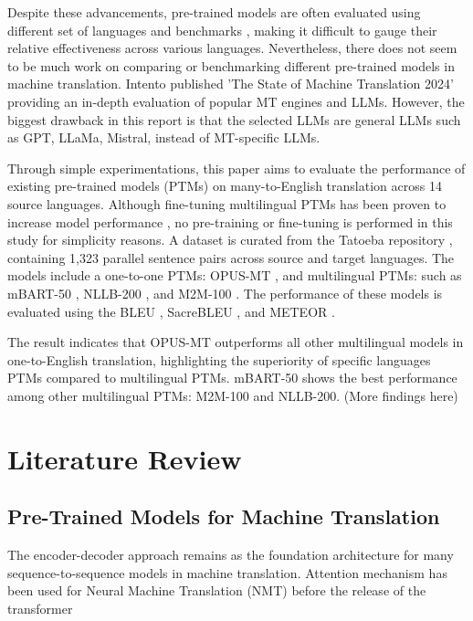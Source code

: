 \documentclass[a4paper]{article}
\begin{document}
Despite these advancements, pre-trained models are often evaluated using different set of languages and benchmarks \cite{liu-2020-mbart,nllb200-2020,fan-2020-m2m100,wei-2023-polylm}, making it difficult to gauge their relative effectiveness across various languages. Nevertheless, there does not seem to be much work on comparing or benchmarking different pre-trained models in machine translation. Intento published 'The State of Machine Translation 2024' \cite{intento-2020} providing an in-depth evaluation of popular MT engines and LLMs. However, the biggest drawback in this report is that the selected LLMs are general LLMs such as GPT, LLaMa, Mistral, instead of MT-specific LLMs.

Through simple experimentations, this paper aims to evaluate the performance of existing pre-trained models (PTMs) on many-to-English translation across 14 source languages. Although fine-tuning multilingual PTMs has been proven to increase model performance \cite{cooper-stickland-2021-recipes}, no pre-training or fine-tuning is performed in this study for simplicity reasons. A dataset is curated from the Tatoeba repository \cite{tatoeba}, containing 1,323 parallel sentence pairs across source and target languages. The models include a one-to-one PTMs: OPUS-MT \cite{tiedemann-2023-democratizing,tiedemann-2020-opus-mt}, and multilingual PTMs: such as mBART-50 \cite{liu-2020-mbart}, NLLB-200 \cite{nllb200-2020}, and M2M-100 \cite{fan-2020-m2m100}. The performance of these models is evaluated using the BLEU \cite{papieni-2002-bleu}, SacreBLEU \cite{post-2018-sacrebleu}, and METEOR \cite{lavie-2007-meteor}.

The result indicates that OPUS-MT outperforms all other multilingual models in one-to-English translation, highlighting the superiority of specific languages PTMs compared to multilingual PTMs. mBART-50 shows the best performance among other multilingual PTMs: M2M-100 and NLLB-200. (More findings here)

\section{Literature Review}

\subsection{Pre-Trained Models for Machine Translation}

The encoder-decoder approach \cite{cho-2014-properties} remains as the foundation architecture for many sequence-to-sequence models in machine translation. Attention mechanism has been used for Neural Machine Translation (NMT) \cite{bahdanau-2016-nmt-jointly, luong-2015-effective-attention} before the release of the transformer \cite{vaswani-2017-attention}
\end{document}
